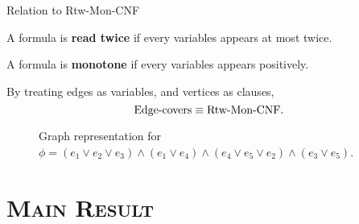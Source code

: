 \documentclass[mathserif]{beamer}
\begin{document}
\begin{frame}{Relation to Rtw-Mon-CNF}
    \begin{definition}
        A formula is {\bf read twice} if every variables appears at most twice.

        A formula is {\bf monotone} if every variables appears positively.
    \end{definition}
By treating edges as variables, and vertices as clauses, 
\[\hbox{Edge-covers} \equiv \hbox{Rtw-Mon-CNF}.\]


	\begin{figure}[htp]
		\centering
		
		\caption{Graph representation for $\phi = (e_1 \vee e_2 \vee e_3) \wedge (e_1 \vee e_4) \wedge (e_4 \vee e_5 \vee e_2 ) \wedge (e_3 \vee e_5)$.}
	\end{figure}
\end{frame}


%	


\section{\scshape Main Result}
\end{document}

